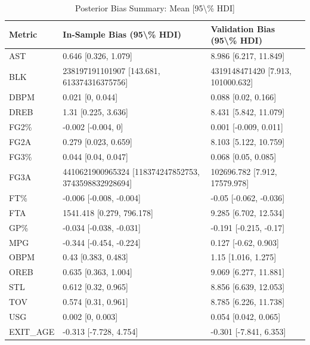 \begin{table}[t]
\caption*{
{\fontsize{20}{25}\selectfont  Posterior Bias Summary: Mean [95\textbackslash{}\% HDI]\fontsize{12}{15}\selectfont }
} 
\fontsize{12.0pt}{14.0pt}\selectfont
\begin{tabular*}{\linewidth}{@{\extracolsep{\fill}}lll}
\toprule
Metric & In-Sample Bias (95\textbackslash{}\% HDI) & Validation Bias (95\textbackslash{}\% HDI) \\ 
\midrule\addlinespace[2.5pt]
AST & 0.646 [0.326, 1.079] & 8.986 [6.217, 11.849] \\ 
BLK & 238197191101907 [143.681, 613374316375756] & 4319148471420 [7.913, 101000.632] \\ 
DBPM & 0.021 [0, 0.044] & 0.088 [0.02, 0.166] \\ 
DREB & 1.31 [0.225, 3.636] & 8.431 [5.842, 11.079] \\ 
FG2\% & -0.002 [-0.004, 0] & 0.001 [-0.009, 0.011] \\ 
FG2A & 0.279 [0.023, 0.659] & 8.103 [5.122, 10.759] \\ 
FG3\% & 0.044 [0.04, 0.047] & 0.068 [0.05, 0.085] \\ 
FG3A & 4410621900965324 [118374247852753, 3743598832928694] & 102696.782 [7.912, 17579.978] \\ 
FT\% & -0.006 [-0.008, -0.004] & -0.05 [-0.062, -0.036] \\ 
FTA & 1541.418 [0.279, 796.178] & 9.285 [6.702, 12.534] \\ 
GP\% & -0.034 [-0.038, -0.031] & -0.191 [-0.215, -0.17] \\ 
MPG & -0.344 [-0.454, -0.224] & 0.127 [-0.62, 0.903] \\ 
OBPM & 0.43 [0.383, 0.483] & 1.15 [1.016, 1.275] \\ 
OREB & 0.635 [0.363, 1.004] & 9.069 [6.277, 11.881] \\ 
STL & 0.612 [0.32, 0.965] & 8.856 [6.639, 12.053] \\ 
TOV & 0.574 [0.31, 0.961] & 8.785 [6.226, 11.738] \\ 
USG & 0.002 [0, 0.003] & 0.054 [0.042, 0.065] \\ 
EXIT\_AGE & -0.313 [-7.728, 4.754] & -0.301 [-7.841, 6.353] \\ 
\bottomrule
\end{tabular*}
\end{table}

